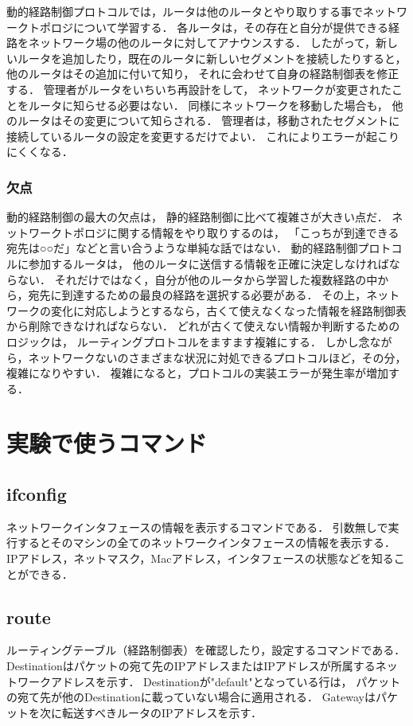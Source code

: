 \documentclass[10pt,a4paper]{jarticle}
\begin{document}
動的経路制御プロトコルでは，ルータは他のルータとやり取りする事でネットワークトポロジについて学習する．
各ルータは，その存在と自分が提供できる経路をネットワーク場の他のルータに対してアナウンスする．
したがって，新しいルータを追加したり，既在のルータに新しいセグメントを接続したりすると，他のルータはその追加に付いて知り，
それに会わせて自身の経路制御表を修正する．
管理者がルータをいちいち再設計をして，
ネットワークが変更されたことをルータに知らせる必要はない．
同様にネットワークを移動した場合も，
他のルータはその変更について知らされる．
管理者は，移動されたセグメントに接続しているルータの設定を変更するだけでよい．
これによりエラーが起こりにくくなる．

\vspace{-6mm}
\subsubsection{欠点}
動的経路制御の最大の欠点は，
静的経路制御に比べて複雑さが大きい点だ．
ネットワークトポロジに関する情報をやり取りするのは，
「こっちが到達できる宛先は○○だ」などと言い合うような単純な話ではない．
動的経路制御プロトコルに参加するルータは，
他のルータに送信する情報を正確に決定しなければならない．
それだけではなく，自分が他のルータから学習した複数経路の中から，宛先に到達するための最良の経路を選択する必要がある．
その上，ネットワークの変化に対応しようとするなら，古くて使えなくなった情報を経路制御表から削除できなければならない．
どれが古くて使えない情報か判断するためのロジックは，
ルーティングプロトコルをますます複雑にする．
しかし念ながら，ネットワークないのさまざまな状況に対処できるプロトコルほど，その分，複雑になりやすい．
複雑になると，プロトコルの実装エラーが発生率が増加する．

\section{実験で使うコマンド}

\subsection{ifconfig}
ネットワークインタフェースの情報を表示するコマンドである．
引数無しで実行するとそのマシンの全てのネットワークインタフェースの情報を表示する．
IPアドレス，ネットマスク，Macアドレス，インタフェースの状態などを知ることができる．

\subsection{route}
ルーティングテーブル（経路制御表）を確認したり，設定するコマンドである．
Destinationはパケットの宛て先のIPアドレスまたはIPアドレスが所属するネットワークアドレスを示す．
Destinationが"default"となっている行は，
パケットの宛て先が他のDestinationに載っていない場合に適用される．
Gatewayはパケットを次に転送すべきルータのIPアドレスを示す．
\end{document}
